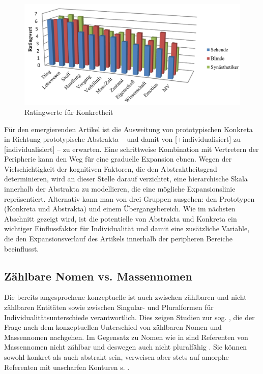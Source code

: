 \begin{figure}
\begin{center}
\includegraphics[width=12cm]{images/rating-konkret-abstrakt-schrauf-neu.jpg}
\caption {Ratingwerte für Konkretheit \parencite[][162]{Schrauf2011}}
\label{abb:schrauf-rating}
\end{center}
\end{figure}

Für den emergierenden Artikel ist die Ausweitung von prototypischen Konkreta in Richtung prototypische Abstrakta -- und damit von [+individualisiert] zu [\textminus{}individualisiert] -- zu erwarten. Eine schrittweise Kombination mit Vertretern der Peripherie kann den Weg für eine graduelle Expansion ebnen. Wegen der Vielschichtigkeit der kognitiven Faktoren, die den Abstraktheitsgrad determinieren, wird an dieser Stelle darauf verzichtet, eine hierarchische Skala innerhalb der  Abstrakta zu modellieren, die eine mögliche Expansionslinie repräsentiert. Alternativ kann man von drei Gruppen ausgehen: den Prototypen (Konkreta und Abstrakta) und einem Übergangsbereich. Wie im nächsten Abschnitt gezeigt wird, ist die potentielle  von Abstrakta und Konkreta ein wichtiger Einflussfaktor für Individualität und damit eine zusätzliche Variable, die den Expansionsverlauf des Artikels innerhalb der peripheren Bereiche beeinflusst.  

\subsection{Zählbare Nomen vs. Massennomen}\label{section:mass}

Die bereits angesprochene konzeptuelle  ist auch zwischen zählbaren und nicht zählbaren Entitäten sowie zwischen Singular- und Pluralformen für Individualitätsunterschiede verantwortlich. Dies zeigen Studien zur sog.  \parencite[s.][]{Jackendoff1991, Langacker1991, Bisle-Muller1991, Rijkhoff1991,Rijkhoff2002, Corbett2000, Massam2012,Zifonun2012}, die der Frage nach dem konzeptuellen Unterschied von zählbaren Nomen und Massennomen nachgehen. Im Gegensatz zu Nomen wie in  sind Referenten von Massennomen nicht zählbar und deswegen auch nicht pluralfähig \parencite[77]{Langacker1991}. Sie können sowohl konkret als auch abstrakt sein, verweisen aber stets auf amorphe Referenten mit unscharfen Konturen s. . 

